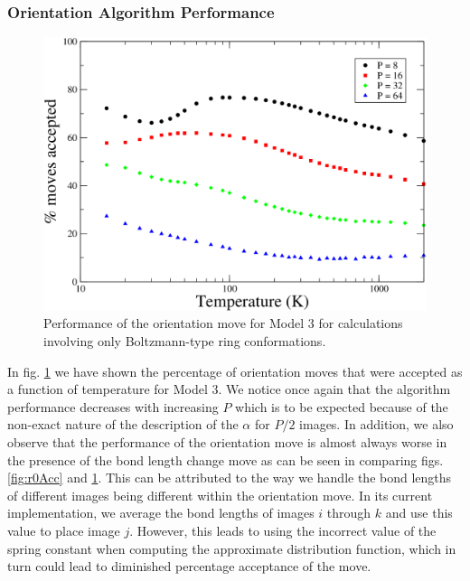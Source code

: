             \subsubsection{Orientation Algorithm Performance}
                \begin{figure}[!htbp]
                    \centering
                    \includegraphics[scale=0.20,keepaspectratio]{Chapter-4/Figures/s3OrAcc.png}
                    \caption{Performance of the orientation move for Model 3 for calculations involving only Boltzmann-type ring conformations.}
                    \label{fig:variableOrAcc}
                \end{figure}

                In fig. \ref{fig:variableOrAcc} we have shown the percentage of orientation moves that were accepted as a function of temperature for Model 3. We notice once again that the algorithm performance decreases with increasing $P$ which is to be expected because of the non-exact nature of the description of the $\alpha$ for $P/2$ images. In addition, we also observe that the performance of the orientation move is almost always worse in the presence of the bond length change move as can be seen in comparing figs. \ref{fig:r0Acc} and \ref{fig:variableOrAcc}. This can be attributed to the way we handle the bond lengths of different images being different within the orientation move. In its current implementation, we average the bond lengths of images $i$ through $k$ and use this value to place image $j$. However, this leads to using the incorrect value of the spring constant when computing the approximate distribution function, which in turn could lead to diminished percentage acceptance of the move.

